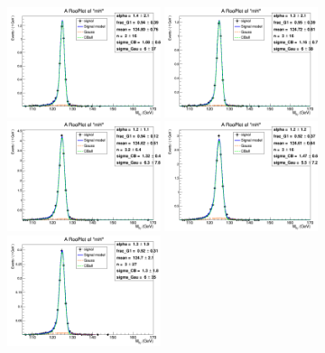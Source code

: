 \begin{figure}
	\begin{center}
		\includegraphics[width=0.40\textwidth]{fig/signal_fit/2018/sigfit_mu_ggF_1_125.png}
		\includegraphics[width=0.40\textwidth]{fig/signal_fit/2018/sigfit_mu_ggF_2_125.png}\\
		\includegraphics[width=0.40\textwidth]{fig/signal_fit/2018/sigfit_mu_ggF_3_125.png}
		\includegraphics[width=0.40\textwidth]{fig/signal_fit/2018/sigfit_mu_ggF_4_125.png}\\
		\includegraphics[width=0.40\textwidth]{fig/signal_fit/2018/sigfit_mu_VBF_501_125.png}

\end{center}
\end{figure}
